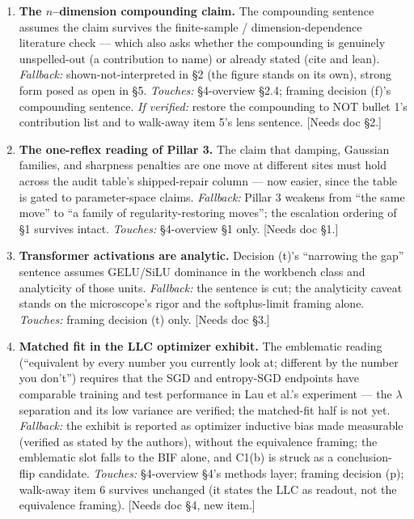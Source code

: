 \documentclass[11pt]{article}
\begin{document}
\begin{enumerate}[label=\textbf{C\arabic*.}, leftmargin=*, itemsep=6pt]
\item \textbf{The $n$--dimension compounding claim.} The compounding
sentence assumes the claim survives the finite-sample /
dimension-dependence literature check --- which also asks whether the
compounding is genuinely unspelled-out (a contribution to name) or
already stated (cite and lean). \emph{Fallback:} shown-not-interpreted
in \S2 (the figure stands on its own), strong form posed as open in
\S5. \emph{Touches:} \S4-overview \S2.4; framing decision (f)'s
compounding sentence. \emph{If verified:} restore the compounding to
NOT bullet 1's contribution list and to walk-away item 5's lens
sentence. [Needs doc \S2.]

\item \textbf{The one-reflex reading of Pillar 3.} The claim that
damping, Gaussian families, and sharpness penalties are one move at
different sites must hold across the audit table's shipped-repair column
--- now easier, since the table is gated to parameter-space claims.
\emph{Fallback:} Pillar 3 weakens from ``the same move'' to ``a family
of regularity-restoring moves''; the escalation ordering of \S1 survives
intact. \emph{Touches:} \S4-overview \S1 only. [Needs doc \S1.]

\item \textbf{Transformer activations are analytic.} Decision (t)'s
``narrowing the gap'' sentence assumes GELU/SiLU dominance in the
workbench class and analyticity of those units. \emph{Fallback:} the
sentence is cut; the analyticity caveat stands on the microscope's rigor
and the softplus-limit framing alone. \emph{Touches:} framing decision
(t) only. [Needs doc \S3.]

\item \textbf{Matched fit in the LLC optimizer exhibit.} The emblematic
reading (``equivalent by every number you currently look at; different
by the number you don't'') requires that the SGD and entropy-SGD
endpoints have comparable training and test performance in Lau et al.'s
experiment --- the $\lambda$ separation and its low variance are
verified; the matched-fit half is not yet. \emph{Fallback:} the exhibit
is reported as optimizer inductive bias made measurable (verified as
stated by the authors), without the equivalence framing; the emblematic
slot falls to the BIF alone, and C1(b) is struck as a conclusion-flip
candidate. \emph{Touches:} \S4-overview \S4's methods layer; framing
decision (p); walk-away item 6 survives unchanged (it states the LLC
as readout, not the equivalence framing). [Needs doc \S4, new item.]

\end{enumerate}
\end{document}

